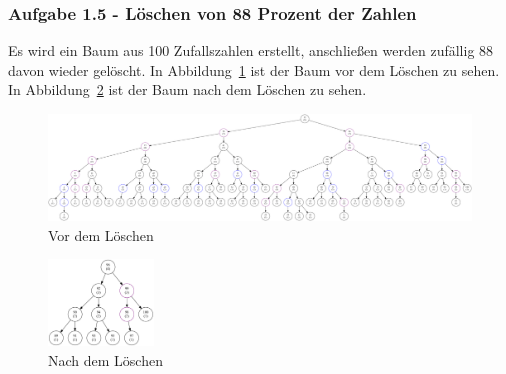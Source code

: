 \subsubsection{Aufgabe 1.5 - Löschen von 88 Prozent der Zahlen}
Es wird ein Baum aus 100 Zufallszahlen erstellt, anschließen werden zufällig 88 davon wieder
gelöscht.
In Abbildung~\ref{fig:88before} ist der Baum vor dem Löschen zu sehen.
In Abbildung~\ref{fig:88after} ist der Baum nach dem Löschen zu sehen.

\begin{figure}[hbtp]
    \centerline{\includegraphics[width = 1.2\textwidth]{img/gv/aufgabe1_6_before.pdf}}
    \caption{Vor dem Löschen}
    \label{fig:88before}
\end{figure}

\begin{figure}[hbtp]
    \centering
    \includegraphics[width = 0.25\textwidth]{img/gv/aufgabe1_6_after.pdf}
    \caption{Nach dem Löschen}
    \label{fig:88after}
\end{figure}

